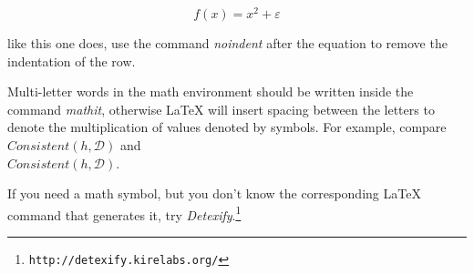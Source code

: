 \documentclass[10pt, a4paper]{article}
\begin{document}
\begin{equation}
f(x) = x^2 + \varepsilon
\end{equation}

\noindent like this one does, use the command \emph{noindent} after the equation to remove the indentation of the row. 

Multi-letter words in the math environment should be written inside the command \emph{mathit}, otherwise \LaTeX{} will insert spacing between the letters to denote the multiplication of values denoted by symbols. For example, compare
$\mathit{Consistent}(h,\mathcal{D})$ and\\
$Consistent(h,\mathcal{D})$.

If you need a math symbol, but you don't know the corresponding \LaTeX{} command that generates it, try
\emph{Detexify}.\footnote{\texttt{http://detexify.kirelabs.org/}}


 
\end{document}
